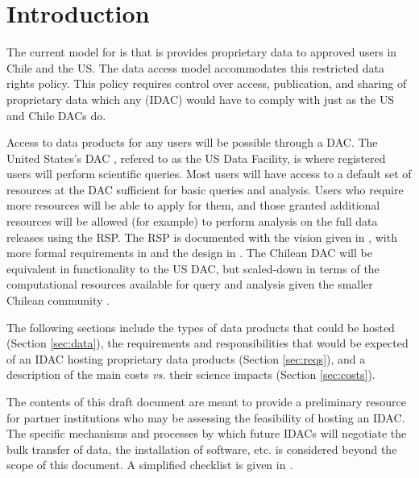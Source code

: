 \section{Introduction}\label{sec:intro}


The current model for \VRO is that is provides proprietary data to approved users in Chile and the \gls{US}. The data access model accommodates this restricted data rights policy. This policy requires control over access, publication, and sharing of proprietary data which any (\gls{IDAC}) would have to comply with just as the \gls{US} and Chile DACs do.

Access to \RO data products for any users will be possible through a \gls{DAC}. The United States's \gls{DAC} , refered to as the \gls{US} Data Facility, is
where registered \RO users will perform scientific queries. Most users will have access to a default set of resources at the \gls{DAC} sufficient for basic queries and analysis. Users who require more resources will be able to apply for them, and those granted additional resources will be allowed (for example) to perform analysis on the full data releases using the \gls{RSP}. The \gls{RSP} is documented with the vision given in , with more formal requirements in  and the design in . The Chilean \gls{DAC} will be equivalent in functionality to the \gls{US} \gls{DAC}, but scaled-down in terms of the computational resources available for query and analysis given the smaller Chilean community .

The following sections include the types of data products that could be hosted (Section \ref{sec:data}), the requirements and responsibilities that would be expected of an \gls{IDAC} hosting \RO proprietary data products (Section \ref{sec:reqs}), and a description of the main costs {\it vs.} their science impacts (Section \ref{sec:costs}).

The contents of this draft document are meant to provide a preliminary resource for partner institutions who may be assessing the feasibility of hosting an \gls{IDAC}. The specific mechanisms and processes by which future \gls{IDAC}s will negotiate the bulk transfer of data, the installation of software, etc. is considered beyond the scope of this document. A simplified checklist is given in .

